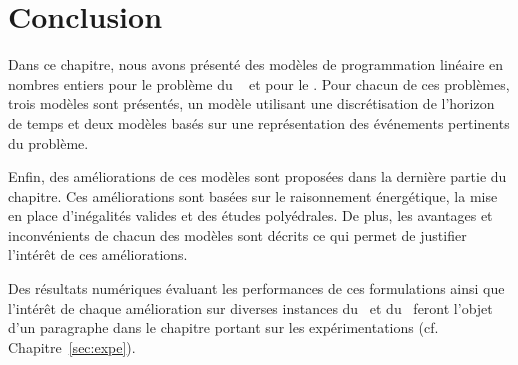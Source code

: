 \chapter*{Conclusion}

Dans ce chapitre, nous avons présenté des modèles de programmation
linéaire en nombres entiers pour le problème du \RCPSP~ et pour le
\CECSP. Pour chacun de ces problèmes, trois modèles sont présentés,
un modèle utilisant une discrétisation de l'horizon de temps et deux
modèles basés sur une représentation des événements pertinents du
problème. 

Enfin, des améliorations de ces modèles sont proposées dans la
dernière partie du chapitre. Ces améliorations sont basées sur le
raisonnement énergétique, la mise en place d'inégalités valides et des
études polyédrales. De plus, les avantages et inconvénients de chacun
des modèles sont décrits ce qui permet de justifier l'intérêt de ces
améliorations. 

Des résultats numériques évaluant les performances de ces formulations
ainsi que l'intérêt de chaque amélioration sur diverses instances du
\CECSP~et du \RCPSP~feront l'objet d'un paragraphe dans le chapitre
portant sur les expérimentations (cf. Chapitre~\ref{sec:expe}). 